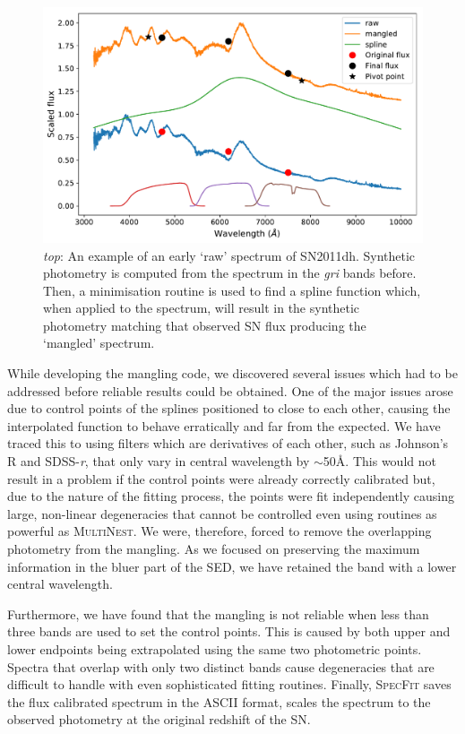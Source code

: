 \begin{figure}
  \centering
  \includegraphics[width=\textwidth]{Figures/Chapter3/Mangling}
  \caption{\textit{top}: An example of an early `raw' spectrum of SN2011dh. Synthetic photometry is computed from the spectrum in the \textit{gri} bands before. Then, a minimisation routine is used to find a spline function which, when applied to the spectrum, will result in the synthetic photometry matching that observed SN flux producing the `mangled' spectrum.}
  \label{fig:SpecMangling}
\end{figure}

While developing the mangling code, we discovered several issues which had to be addressed before reliable results could be obtained. One of the major issues arose due to control points of the splines positioned to close to each other, causing the interpolated function to behave erratically and far from the expected. We have traced this to using filters which are derivatives of each other, such as Johnson's R and SDSS-\textit{r}, that only vary in central wavelength by $\sim$50\AA. This would not result in a problem if the control points were already correctly calibrated but, due to the nature of the fitting process, the points were fit independently causing large, non-linear degeneracies that cannot be controlled even using routines as powerful as \textsc{MultiNest}. We were, therefore, forced to remove the overlapping photometry from the mangling. As we focused on preserving the maximum information in the bluer part of the SED, we have retained the band with a lower central wavelength.

Furthermore, we have found that the mangling is not reliable when less than three bands are used to set the control points. This is caused by both upper and lower endpoints being extrapolated using the same two photometric points. Spectra that overlap with only two distinct bands cause degeneracies that are difficult to handle with even sophisticated fitting routines. Finally, \textsc{SpecFit} saves the flux calibrated spectrum in the ASCII format, scales the spectrum to the observed photometry at the original redshift of the SN.

